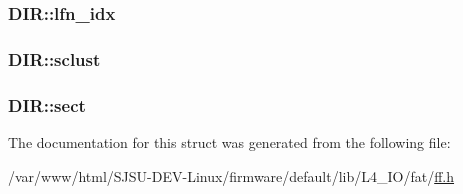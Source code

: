 \subsubsection[{\texorpdfstring{lfn\+\_\+idx}{lfn_idx}}]{ D\+I\+R\+::lfn\+\_\+idx}\hypertarget{structDIR_acad41b18758c9278c14d47076e8149fc}{}\label{structDIR_acad41b18758c9278c14d47076e8149fc}
\subsubsection[{\texorpdfstring{sclust}{sclust}}]{ D\+I\+R\+::sclust}\hypertarget{structDIR_a9212af5877b94d790dd3bab3aa320994}{}\label{structDIR_a9212af5877b94d790dd3bab3aa320994}
\subsubsection[{\texorpdfstring{sect}{sect}}]{ D\+I\+R\+::sect}\hypertarget{structDIR_ad01fcc812ed0dad11a593574336adc9e}{}\label{structDIR_ad01fcc812ed0dad11a593574336adc9e}


The documentation for this struct was generated from the following file\+:\begin{DoxyCompactItemize}
\item 
/var/www/html/\+S\+J\+S\+U-\/\+D\+E\+V-\/\+Linux/firmware/default/lib/\+L4\+\_\+\+I\+O/fat/\hyperlink{ff_8h}{ff.\+h}\end{DoxyCompactItemize}
